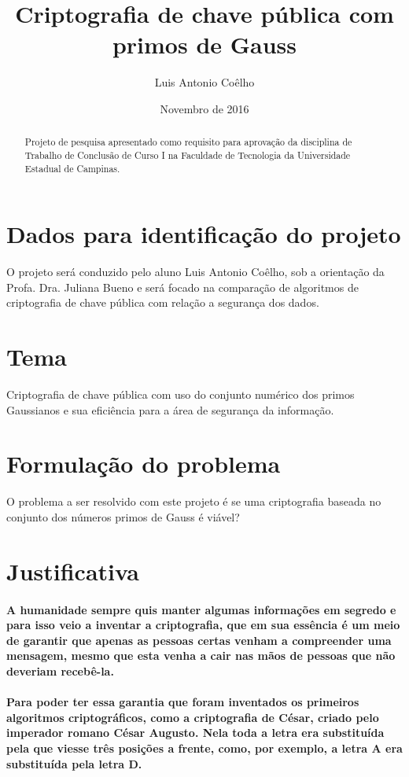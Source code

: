 \documentclass{article}
\title{Criptografia de chave pública com primos de Gauss}
\author{Luis Antonio Coêlho}
\date{Novembro de 2016}
\begin{document}
	
	\maketitle
	\begin{abstract}
		Projeto de pesquisa apresentado como requisito para aprovação da disciplina de Trabalho de Conclusão de Curso I na Faculdade de Tecnologia da Universidade Estadual de Campinas.
	\end{abstract}
	\tableofcontents
	
	\section{Dados para identificação do projeto}
	O projeto será conduzido pelo aluno Luis Antonio Coêlho, sob a orientação da Profa. Dra. Juliana Bueno e será focado na comparação de algoritmos de criptografia de chave pública com relação a segurança dos dados.
	\section{Tema}
	Criptografia de chave pública com uso do conjunto numérico dos primos Gaussianos e sua eficiência para a área de segurança da informação.
	\section{Formulação do problema}
	O problema a ser resolvido com este projeto é se uma criptografia baseada no conjunto dos números primos de Gauss é viável?
	\section{Justificativa}
	\paragraph{
		A humanidade sempre quis manter algumas informações em segredo e para isso veio a inventar a criptografia, que em sua essência é um meio de garantir que apenas as pessoas certas venham a compreender uma mensagem, mesmo que esta venha a cair nas mãos de pessoas que não deveriam recebê-la.
	}
	\paragraph{
		Para poder ter essa garantia que foram inventados os primeiros algoritmos criptográficos, como a criptografia de César, criado pelo imperador romano César Augusto. Nela toda a letra era substituída pela que viesse três posições a frente, como,  por exemplo, a letra A era substituída pela letra D.
	}
\end{document}
